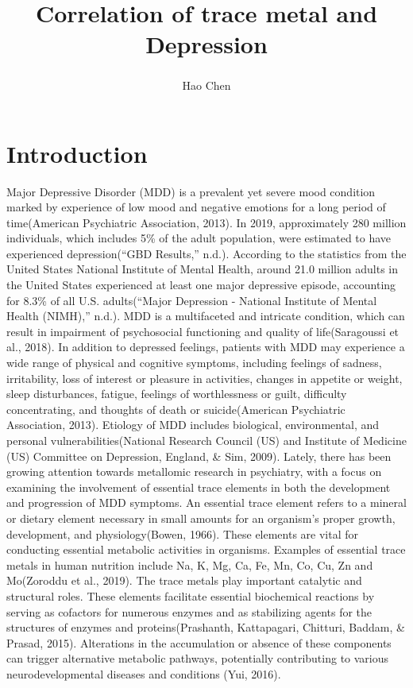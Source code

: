 \documentclass[
  man]{apa6}
\title{Correlation of trace metal and Depression}
\author{Hao Chen\textsuperscript{}}
\date{}
\affiliation{\vspace{0.5cm}\textsuperscript{1} University of Chicago}
\begin{document}
\maketitle

\hypertarget{introduction}{%
\section{Introduction}\label{introduction}}

Major Depressive Disorder (MDD) is a prevalent yet severe mood condition marked by experience of low mood and negative emotions for a long period of time(American Psychiatric Association, 2013). In 2019, approximately 280 million individuals, which includes 5\% of the adult population, were estimated to have experienced depression({``{GBD Results},''} n.d.). According to the statistics from the United States National Institute of Mental Health, around 21.0 million adults in the United States experienced at least one major depressive episode, accounting for 8.3\% of all U.S. adults({``Major {Depression} - {National Institute} of {Mental Health} ({NIMH}),''} n.d.).
MDD is a multifaceted and intricate condition, which can result in impairment of psychosocial functioning and quality of life(Saragoussi et al., 2018). In addition to depressed feelings, patients with MDD may experience a wide range of physical and cognitive symptoms, including feelings of sadness, irritability, loss of interest or pleasure in activities, changes in appetite or weight, sleep disturbances, fatigue, feelings of worthlessness or guilt, difficulty concentrating, and thoughts of death or suicide(American Psychiatric Association, 2013).
Etiology of MDD includes biological, environmental, and personal vulnerabilities(National Research Council (US) and Institute of Medicine (US) Committee on Depression, England, \& Sim, 2009). Lately, there has been growing attention towards metallomic research in psychiatry, with a focus on examining the involvement of essential trace elements in both the development and progression of MDD symptoms. An essential trace element refers to a mineral or dietary element necessary in small amounts for an organism's proper growth, development, and physiology(Bowen, 1966). These elements are vital for conducting essential metabolic activities in organisms. Examples of essential trace metals in human nutrition include Na, K, Mg, Ca, Fe, Mn, Co, Cu, Zn and Mo(Zoroddu et al., 2019). The trace metals play important catalytic and structural roles. These elements facilitate essential biochemical reactions by serving as cofactors for numerous enzymes and as stabilizing agents for the structures of enzymes and proteins(Prashanth, Kattapagari, Chitturi, Baddam, \& Prasad, 2015). Alterations in the accumulation or absence of these components can trigger alternative metabolic pathways, potentially contributing to various neurodevelopmental diseases and conditions (Yui, 2016).
\end{document}
